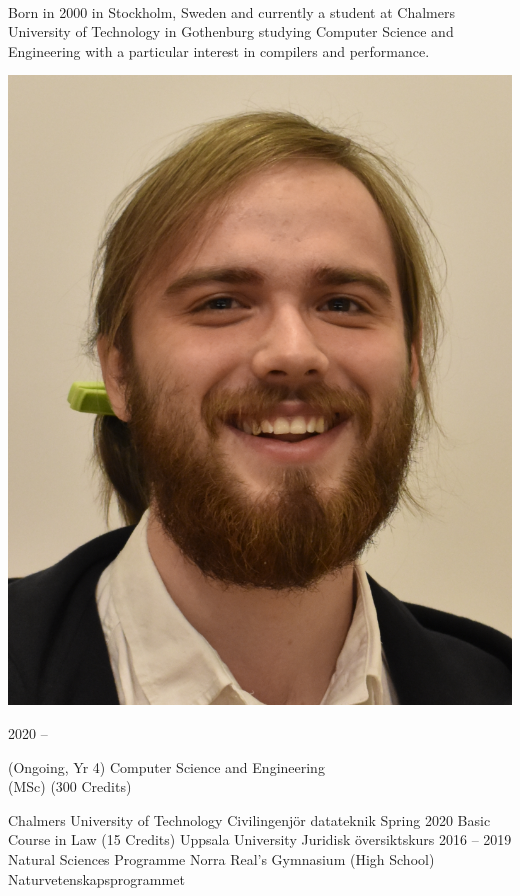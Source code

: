 \documentclass[9pt]{developercv}
\begin{document}
\begin{minipage}[t]{0.7\textwidth}
	\vspace{-\baselineskip}
	\\Born in 2000 in Stockholm, Sweden and currently a student at Chalmers
	University of Technology in Gothenburg studying Computer Science and
	Engineering with a particular interest in compilers and performance.
\end{minipage}
\hfill
\begin{minipage}[t]{0.2\textwidth}
	\vspace{-\baselineskip}
	\includegraphics[width=\linewidth]{smaller.png}
\end{minipage}
\begin{entrylist}
	\entry
		{2020 -- }
		{
			\begin{minipage}[t]{0.5\textwidth}
				(Ongoing, Yr 4) Computer Science and Engineering \\ (MSc) (300 Credits)
			\end{minipage}
		}
		{Chalmers University of Technology}
		{Civilingenjör datateknik}
	\entry
		{Spring 2020}
		{Basic Course in Law (15 Credits)}
		{Uppsala University}
		{Juridisk översiktskurs}
	\entry
		{2016 -- 2019}
		{Natural Sciences Programme}
		{Norra Real's Gymnasium (High School)}
		{Naturvetenskapsprogrammet}
\end{entrylist}
\end{document}
